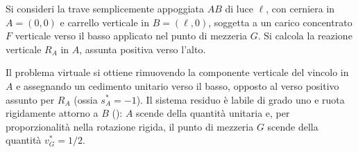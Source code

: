 \begin{esempio}
	\label{ex:TSV_trave_semplice}
	
	Si consideri la trave semplicemente appoggiata $AB$ di
	luce $\ell$, con cerniera in $A = (0,0)$ e carrello
	verticale in $B = (\ell, 0)$, soggetta a un carico
	concentrato $F$ verticale verso il basso applicato nel
	punto di mezzeria $G$. Si calcola la reazione verticale
	$R_A$ in $A$, assunta positiva verso l'alto.
	
	Il problema virtuale si ottiene rimuovendo la componente
	verticale del vincolo in $A$ e assegnando un cedimento
	unitario verso il basso, opposto al verso positivo
	assunto per $R_A$ (ossia $s^*_A = -1$). Il sistema
	residuo è labile di grado uno e ruota rigidamente
	attorno a $B$ (): $A$
	scende della quantità unitaria e, per proporzionalità
	nella rotazione rigida, il punto di mezzeria $G$ scende
	della quantità $v^*_G = 1/2$.
	
	\begin{figure}[ht]
		\centering
\end{figure}
\end{esempio}
